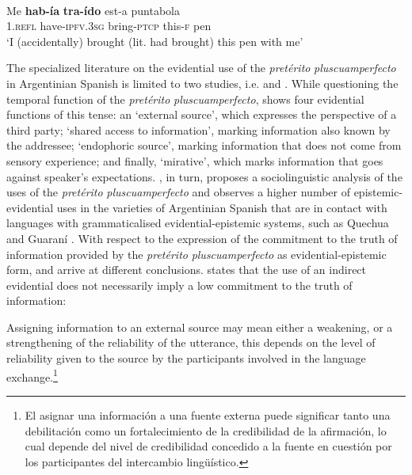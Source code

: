 \documentclass[output=paper]{langsci/langscibook}
\begin{document}
\ea \label{ex:gq8}
	\\
	\gll Me \textbf{hab-ía} \textbf{tra-ído} est-a puntabola\\
	1.\textsc{refl} have-\textsc{ipfv.3sg} bring-\textsc{ptcp} this-\textsc{f} pen\\
	\glt ‘I (accidentally) brought (lit. had brought) this pen with me’
\z

The specialized literature on the evidential use of the \textit{pretérito} \textit{pluscuamperfecto} in Argentinian Spanish is limited to two studies, i.e. \citet{Bermudez2008} and \citet{Speranza2014}. While questioning the temporal function of the \textit{pretérito} \textit{pluscuamperfecto}, \citet{Bermudez2008} shows four evidential functions of this tense: an ‘external source’, which expresses the perspective of a third party; ‘shared access to information’, marking information also known by the addressee; ‘endophoric source’, marking information that does not come from sensory experience; and finally, ‘mirative’, which marks information that goes against speaker’s expectations. \citet{Speranza2014}, in turn, proposes a sociolinguistic analysis of the uses of the \textit{pretérito} \textit{pluscuamperfecto} and observes a higher number of epistemic-evidential uses in the varieties of Argentinian Spanish that are in contact with languages with grammaticalised evidential-epistemic systems, such as Quechua and Guaraní \citep[26]{Speranza2014}. With respect to the expression of the commitment to the truth of information provided by the \textit{pretérito} \textit{pluscuamperfecto} as evidential-epistemic form, \citet{Bermudez2008} and \citet{Speranza2014} arrive at different conclusions. \citet[217]{Bermudez2008} states that the use of an indirect evidential does not necessarily imply a low commitment to the truth of information: 

\begin{displayquote}
Assigning information to an external source may mean either a weakening, or a strengthening of the reliability of the utterance, this depends on the level of reliability given to the source by the participants involved in the language exchange.\footnote{El asignar una información a una fuente externa puede significar tanto una debilitación como un fortalecimiento de la credibilidad de la afirmación, lo cual depende del nivel de credibilidad concedido a la fuente en cuestión por los participantes del intercambio lingüístico.}	
\end{displayquote}
\end{document}

